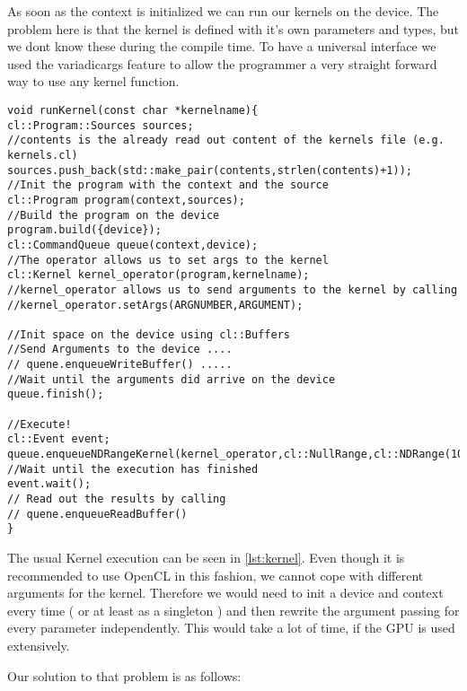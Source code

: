 \documentclass{acm_proc_article-sp}
\begin{document}
As soon as the context is initialized we can run our kernels on the device. The problem here is that the kernel is defined with it's own parameters and types, but we dont know these during the compile time.
To have a universal interface we used the variadicargs feature to allow the programmer a very straight forward way to use any kernel function.
\label{lst:kernel}
\begin{lstlisting}[caption=Kernel usage]
void runKernel(const char *kernelname){
cl::Program::Sources sources;
//contents is the already read out content of the kernels file (e.g. kernels.cl)
sources.push_back(std::make_pair(contents,strlen(contents)+1));
//Init the program with the context and the source
cl::Program program(context,sources);
//Build the program on the device
program.build({device});
cl::CommandQueue queue(context,device);
//The operator allows us to set args to the kernel 
cl::Kernel kernel_operator(program,kernelname);
//kernel_operator allows us to send arguments to the kernel by calling
//kernel_operator.setArgs(ARGNUMBER,ARGUMENT);

//Init space on the device using cl::Buffers
//Send Arguments to the device ....
// quene.enqueueWriteBuffer() .....
//Wait until the arguments did arrive on the device
queue.finish();

//Execute!
cl::Event event;
queue.enqueueNDRangeKernel(kernel_operator,cl::NullRange,cl::NDRange(10),cl::NullRange,NULL,&event);
//Wait until the execution has finished
event.wait();
// Read out the results by calling 
// quene.enqueueReadBuffer()
}
\end{lstlisting}

The usual Kernel execution can be seen in \ref{lst:kernel}. Even though it is recommended to use OpenCL in this fashion, we cannot cope with different arguments for the kernel. Therefore we would need to init a device and context every time ( or at least as a singleton ) and then rewrite the argument passing for every parameter independently. This would take a lot of time, if the GPU is used extensively.

Our solution to that problem is as follows:
\end{document}
